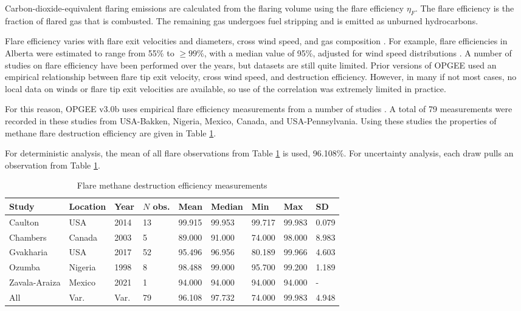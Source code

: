 \documentclass[11pt]{report}
\newcommand{\version}{v3.0b }
\begin{document}
Carbon-dioxide-equivalent flaring emissions are calculated from the flaring volume using the flare efficiency $\eta_F$. The flare efficiency is the fraction of flared gas that is combusted. The remaining gas undergoes fuel stripping and is emitted as unburned hydrocarbons. 

Flare efficiency varies with flare exit velocities and diameters, cross wind speed, and gas composition \cite{Johnson2001, Johnson2008}. For example, flare efficiencies in Alberta were estimated to range from 55\% to $\geq 99$\%, with a median value of 95\%, adjusted for wind speed distributions \cite{Johnson2008}. A number of studies on flare efficiency have been performed over the years, but datasets are still quite limited. Prior versions of OPGEE used an empirical relationship between flare tip exit velocity, cross wind speed, and destruction efficiency. However, in many if not most cases, no local data on winds or flare tip exit velocities are available, so use of the correlation was extremely limited in practice.

For this reason, OPGEE \version uses empirical flare efficiency measurements from a number of studies \cite{Ozumba2000, Gvakharia2017, Chambers2003, Zavala2021, Caulton2014a}. A total of 79 measurements were recorded in these studies from USA-Bakken, Nigeria, Mexico, Canada, and USA-Pennsylvania. Using these studies the properties of methane flare destruction efficiency are given in Table \ref{tab:empirical_flare_eff}.

For deterministic analysis, the mean of all flare observations from Table \ref{tab:empirical_flare_eff} is used, 96.108\%. For uncertainty analysis, each draw pulls an observation from Table \ref{tab:empirical_flare_eff}.

\begin{table}
\begin{scriptsize}
\caption{Flare methane destruction efficiency measurements}
\label{tab:empirical_flare_eff}
\begin{tabular*}{1\columnwidth}{p{}p{}p{}p{}p{}p{}p{}p{}p{}}
\toprule
Study & Location & Year & $N$ obs. & Mean & Median & Min & Max & SD \\
\midrule
Caulton & USA & 2014 & 13 & 99.915 & 99.953 & 99.717 & 99.983 & 0.079 \\
Chambers & Canada & 2003 & 5 & 89.000	& 91.000 & 74.000 & 98.000 & 8.983 \\
Gvakharia & USA & 2017 & 52 & 95.496 & 96.956 & 80.189 & 99.966 & 4.603 \\
Ozumba & Nigeria & 1998 & 8 & 98.488 & 99.000 & 95.700 & 99.200 & 1.189 \\
Zavala-Araiza & Mexico & 2021 & 1 & 94.000 & 94.000 & 94.000 & 94.000 & - \\
\midrule
All 			& Var. & Var. & 79 & 96.108  & 97.732 & 74.000 & 99.983 & 4.948 \\
\bottomrule
\end{tabular*}
\end{scriptsize}
\end{table}
\end{document}
